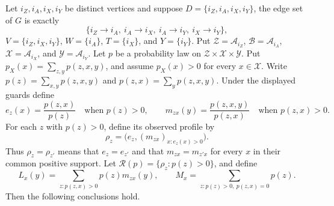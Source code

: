 Let \(i_Z,i_A,i_X,i_Y\) be distinct vertices and suppose
\(D=\{i_Z,i_A,i_X,i_Y\}\), the edge set of \(G\) is exactly
\[
\{i_Z\mathbin{\to} i_A,\ i_A\mathbin{\to} i_X,
  \ i_A\mathbin{\to} i_Y,\ i_X\mathbin{\to} i_Y\},
\]
\(V=\{i_Z,i_X,i_Y\}\), \(W=\{i_A\}\), \(T=\{i_X\}\), and
\(Y=\{i_Y\}\).  Put
\(\mathcal Z=\mathcal A_{i_Z}\), \(\mathcal B=\mathcal A_{i_A}\),
\(\mathcal X=\mathcal A_{i_X}\), and \(\mathcal Y=\mathcal A_{i_Y}\).
Let \(p\) be a probability law on
\(\mathcal Z\times\mathcal X\times\mathcal Y\).  Put
\(p_X(x)=\sum_{z,y}p(z,x,y)\), and assume \(p_X(x)>0\) for every
\(x\in\mathcal X\).  Write
\(p(z)=\sum_{x,y}p(z,x,y)\) and \(p(z,x)=\sum_y p(z,x,y)\).  Under
the displayed guards define
\[
 e_z(x)=\frac{p(z,x)}{p(z)}\quad\text{when }p(z)>0,
 \qquad
 m_{zx}(y)=\frac{p(z,x,y)}{p(z,x)}\quad\text{when }p(z,x)>0.
\]
For each \(z\) with \(p(z)>0\), define its observed profile by
\[
 \rho_z=\bigl(e_z,(m_{zx})_{x:e_z(x)>0}\bigr).
\]
Thus \(\rho_z=\rho_{z'}\) means that \(e_z=e_{z'}\) and that
\(m_{zx}=m_{z'x}\) for every \(x\) in their common positive support.  Let
\(\mathcal R(p)=\{\rho_z:p(z)>0\}\), and define
\[
 L_x(y)=\sum_{z:p(z,x)>0}p(z)m_{zx}(y),
 \qquad
 M_x=\sum_{z:p(z)>0,\ p(z,x)=0}p(z).
\]
Then the following conclusions hold.
